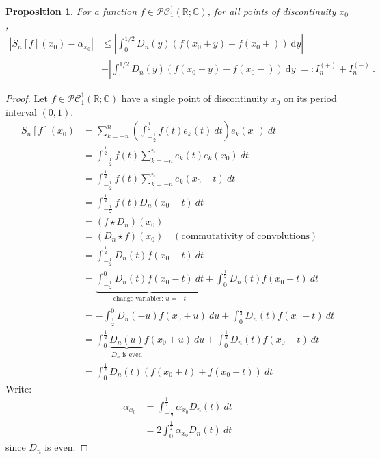 \documentclass[12pt, reqno]{amsart}
\newtheorem{prop}{Proposition}[section]
\theoremstyle{definition}
\theoremstyle{remark}
\newcommand{\ud}{\mathrm{d}}
\begin{document}
\begin{itemize}
\begin{itemize}
\begin{prop}
   For a function $f\in\mathcal{PC}_1^1(\mathbb{R;C})$, for all points of discontinuity $x_0$,
\begin{align}
\left\vert S_n[f](x_0) - \alpha_{x_0} \right\vert & \leq \left\vert \int_0^{1/2} D_n(y) \left( f(x_0 + y) - f(x_0+) \right) ~\ud y    \right\vert \nonumber \\
   & + \left\vert \int_0^{1/2} D_n(y) ( f(x_0 - y) - f(x_0-) ) ~\ud y    \right\vert =: I_n^{(+)} + I_n^{(-)} ~\mbox{.}
\end{align}
\end{prop}

\begin{proof}
   
Let $f\in\mathcal{PC}_{1}^{1}(\mathbb{R};\mathbb{C})$ have a single point of discontinuity $x_{0}$ on its period interval $(0,1)$. 
\begin{align*}
S_{n}[f](x_{0})&= \sum_{k=-n}^{n}\left(\int_{- \frac{1}{2}}^{\frac{1}{2}}f(t)\overline{e_{k}(t)}\ dt\right)e_{k}(x_{0})\ dt\\
&= \int_{- \frac{1}{2}}^{\frac{1}{2}}f(t)\sum_{k=-n}^{n}\overline{e_{k}(t)}e_{k}(x_{0})\ dt\\
&= \int_{- \frac{1}{2}}^{\frac{1}{2}}f(t) \sum_{k=-n}^{n}e_{k}(x_{0}-t)\ dt\\
&= \int_{-\frac{1}{2}}^{\frac{1}{2}}f(t)D_{n}(x_{0}-t)\ dt\\
&= (f\star D_{n})(x_{0})\\
&= (D_{n}\star f)(x_{0})\quad(\text{commutativity of convolutions})\\
&= \int_{- \frac{1}{2}}^{\frac{1}{2}}D_{n}(t)f(x_{0}-t)\ dt\\
&= \underbrace{\int_{- \frac{1}{2}}^{0}D_{n}(t)f(x_{0}-t)\ dt}_{\text{change variables: }u=-t}+\int_{0}^{\frac{1}{2}}D_{n}(t)f(x_{0}-t)\ dt\\
&= -\int_{\frac{1}{2}}^{0}D_{n}(-u)f(x_{0}+u)\ du+\int_{0}^{\frac{1}{2}}D_{n}(t)f(x_{0}-t)\ dt\\
&= \int_{0}^{\frac{1}{2}}\underbrace{D_{n}(u)}_{D_{n}\text{ is even}}f(x_{0}+u)\ du+\int_{0}^{\frac{1}{2}}D_{n}(t)f(x_{0}-t)\ dt\\
&= \int_{0}^{\frac{1}{2}}D_{n}(t)(f(x_{0}+t)+f(x_{0}-t))\ dt
\end{align*}
Write:
\begin{align*}
\alpha_{x_{0}}&= \int_{- \frac{1}{2}}^{\frac{1}{2}}\alpha_{x_{0}}D_{n}(t)\ dt\\
&= 2\int_{0}^{\frac{1}{2}}\alpha_{x_{0}}D_{n}(t)\ dt
\end{align*}
since $D_{n}$ is even. 


\end{proof}
\end{itemize}
\end{itemize}
\end{document}
